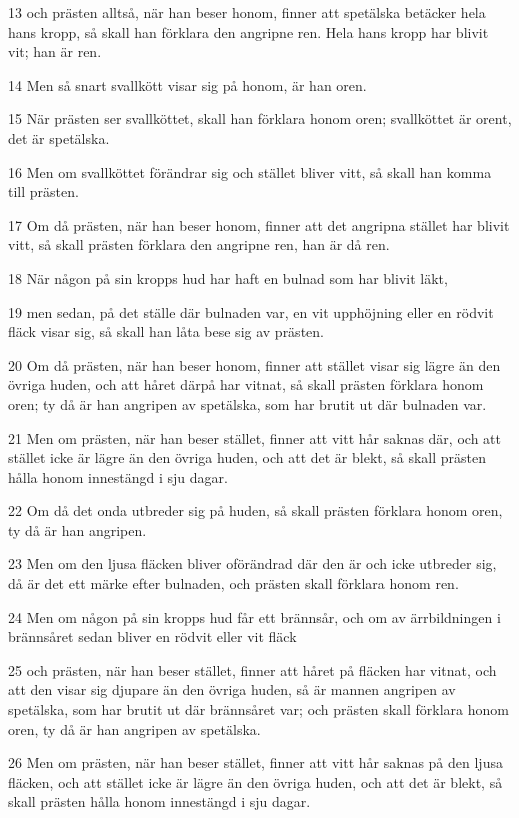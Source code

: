 \par 13 och prästen alltså, när han beser honom, finner att spetälska betäcker hela hans kropp, så skall han förklara den angripne ren. Hela hans kropp har blivit vit; han är ren.
\par 14 Men så snart svallkött visar sig på honom, är han oren.
\par 15 När prästen ser svallköttet, skall han förklara honom oren; svallköttet är orent, det är spetälska.
\par 16 Men om svallköttet förändrar sig och stället bliver vitt, så skall han komma till prästen.
\par 17 Om då prästen, när han beser honom, finner att det angripna stället har blivit vitt, så skall prästen förklara den angripne ren, han är då ren.
\par 18 När någon på sin kropps hud har haft en bulnad som har blivit läkt,
\par 19 men sedan, på det ställe där bulnaden var, en vit upphöjning eller en rödvit fläck visar sig, så skall han låta bese sig av prästen.
\par 20 Om då prästen, när han beser honom, finner att stället visar sig lägre än den övriga huden, och att håret därpå har vitnat, så skall prästen förklara honom oren; ty då är han angripen av spetälska, som har brutit ut där bulnaden var.
\par 21 Men om prästen, när han beser stället, finner att vitt hår saknas där, och att stället icke är lägre än den övriga huden, och att det är blekt, så skall prästen hålla honom innestängd i sju dagar.
\par 22 Om då det onda utbreder sig på huden, så skall prästen förklara honom oren, ty då är han angripen.
\par 23 Men om den ljusa fläcken bliver oförändrad där den är och icke utbreder sig, då är det ett märke efter bulnaden, och prästen skall förklara honom ren.
\par 24 Men om någon på sin kropps hud får ett brännsår, och om av ärrbildningen i brännsåret sedan bliver en rödvit eller vit fläck
\par 25 och prästen, när han beser stället, finner att håret på fläcken har vitnat, och att den visar sig djupare än den övriga huden, så är mannen angripen av spetälska, som har brutit ut där brännsåret var; och prästen skall förklara honom oren, ty då är han angripen av spetälska.
\par 26 Men om prästen, när han beser stället, finner att vitt hår saknas på den ljusa fläcken, och att stället icke är lägre än den övriga huden, och att det är blekt, så skall prästen hålla honom innestängd i sju dagar.

